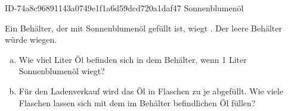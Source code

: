 \begin{exercise}
      {ID-74a8c96891143a0749e1f1a6d59dcd720a1daf47}
      {Sonnenblumenöl}
  \ifproblem\problem\par
    Ein Behälter, der mit Sonnenblumenöl gefüllt ist, wiegt  .
    Der leere Behälter würde   wiegen.
    \begin{enumerate}[a)]
      \item Wie vliel Liter Öl befinden sich in dem Behälter, wenn 1 Liter
            Sonnenblumenöl  wiegt?
      \item Für den Ladenverkauf wird das Öl in Flaschen zu je 
            abgefüllt. Wie viele Flaschen lassen sich mit dem im Behälter
            befindlichen Öl füllen?
    \end{enumerate}
  \fi
\end{exercise}
